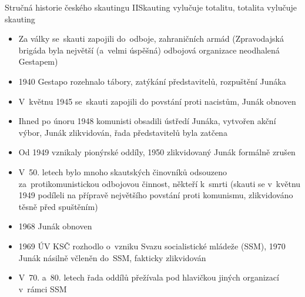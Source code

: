 \documentclass[compress, xelatex, 11pt, xcolor=dvipsnames, aspectratio=169, url={hyphens, lowtilde}]{beamer}
\begin{document}
\begin{frame}{Stručná historie českého skautingu II}{Skauting vylučuje totalitu, totalita vylučuje skauting}
	\begin{itemize}
		\item Za války se~skauti zapojili do~odboje, zahraničních armád (Zpravodajská brigáda byla největší (a~velmi úspěšná) odbojová organizace neodhalená Gestapem)
		\item 1940 Gestapo rozehnalo tábory, zatýkání představitelů, rozpuštění Junáka
		\item V~květnu 1945 se~skauti zapojili do povstání proti nacistům, Junák obnoven
		\item Ihned po únoru 1948 komunisti obsadili ústředí Junáka, vytvořen akční výbor, Junák zlikvidován, řada představitelů byla zatčena
		\item Od 1949 vznikaly pionýrské oddíly, 1950 zlikvidovaný Junák formálně zrušen
		\item V~50. letech bylo mnoho skautských činovníků odsouzeno za~protikomunistickou odbojovou činnost, někteří k~smrti (skauti se v~květnu 1949 podíleli na přípravě největšího povstání proti komunismu, zlikvidováno těsně před spuštěním)
		\item 1968 Junák obnoven
		\item 1969 ÚV KSČ rozhodlo o~vzniku Svazu socialistické mládeže (SSM), 1970 Junák násilně včleněn do~SSM, fakticky zlikvidován
		\item V~70. a~80. letech řada oddílů přežívala pod hlavičkou jiných organizací v~rámci SSM
	\end{itemize}
\end{frame}
\end{document}
